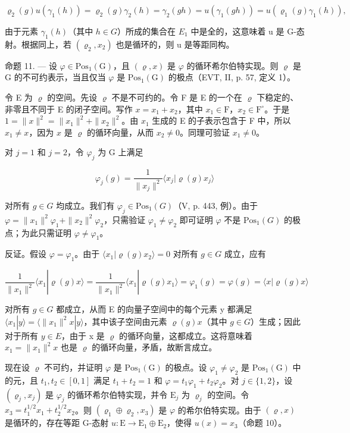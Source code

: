 \[
\varrho_ {2} (g) u \left(\gamma_ {1} (h)\right) = \varrho_ {2} (g) \gamma_ {2} (h) = \gamma_ {2} (g h) = u \left(\gamma_ {1} (g h)\right) = u \left(\varrho_ {1} (g) \gamma_ {1} (h)\right),
\]

由于元素 \(\gamma_{1}(h)\)（其中 \(h \in G\)）所成的集合在 \(E_{1}\) 中是全的，这意味着 u 是 G-态射。根据同上，若 \((\varrho_{2}, x_{2})\) 也是循环的，则 u 是等距同构。

命题 11. — 设 \(\varphi \in \mathrm{Pos}_{1}(\mathrm{G})\)，且 \((\varrho, x)\) 是 \(\varphi\) 的循环希尔伯特实现。则 \(\varrho\) 是 G 的不可约表示，当且仅当 \(\varphi\) 是 \(\mathrm{Pos}_{1}(\mathrm{G})\) 的极点（EVT, II, p. 57, 定义 1）。

令 E 为 \(\varrho\) 的空间。先设 \(\varrho\) 不是不可约的。令 F 是 E 的一个在 \(\varrho\) 下稳定的、非零且不同于 E 的闭子空间。写作 \(x = x_1 + x_2\)，其中 \(x_1 \in \mathrm{F}\)，\(x_2 \in \mathrm{F}^\circ\)。于是 \(1 = \|x\|^2 = \|x_1\|^2 + \|x_2\|^2\)。由 \(x_1\) 生成的 E 的子表示包含于 F 中，所以 \(x_1 \neq x\)，因为 \(x\) 是 \(\varrho\) 的循环向量，从而 \(x_2 \neq 0\)。同理可验证 \(x_1 \neq 0\)。

对 \(j = 1\) 和 \(j = 2\)，令 \(\varphi_j\) 为 G 上满足

\[
\varphi_ {j} (g) = \frac {1}{\| x _ {j} \| ^ {2}} \langle x _ {j} | \varrho (g) x _ {j} \rangle
\]

对所有 \(g \in G\) 均成立。我们有 \(\varphi_{j} \in \mathrm{Pos}_{1}(G)\)（V, p. 443, 例）。由于 \(\varphi = \|x_{1}\|^{2}\varphi_{1} + \|x_{2}\|^{2}\varphi_{2}\)，只需验证 \(\varphi_{1} \neq \varphi_{2}\) 即可证明 \(\varphi\) 不是 \(\mathrm{Pos}_{1}(G)\) 的极点；为此只需证明 \(\varphi \neq \varphi_{1}\)。

反证。假设 \(\varphi = \varphi_1\)。由于 \(\langle x_1 | \varrho(g)x_2 \rangle = 0\) 对所有 \(g \in G\) 成立，应有

\[
\frac {1}{\| x _ {1} \| ^ {2}} \langle x _ {1} | \varrho (g) x \rangle = \frac {1}{\| x _ {1} \| ^ {2}} \langle x _ {1} | \varrho (g) x _ {1} \rangle = \varphi_ {1} (g) = \varphi (g) = \langle x | \varrho (g) x \rangle
\]

对所有 \(g \in G\) 都成立，从而 E 的向量子空间中的每个元素 y 都满足 \(\langle x_{1} | y \rangle = \langle \|x_{1}\|^{2}x | y \rangle\)，其中该子空间由元素 \(\varrho(g)x\)（其中 \(g \in G\)）生成；因此对于所有 \(y \in E\)，由于 x 是 \(\varrho\) 的循环向量，这都成立。这将意味着 \(x_{1} = \|x_{1}\|^{2}x\) 也是 \(\varrho\) 的循环向量，矛盾，故断言成立。

现在设 \(\varrho\) 不可约，并证明 \(\varphi\) 是 \(\mathrm{Pos}_1(\mathrm{G})\) 的极点。设 \(\varphi_1 \neq \varphi_2\) 是 \(\mathrm{Pos}_1(\mathrm{G})\) 中的元，且 \(t_1, t_2 \in [0,1]\) 满足 \(t_1 + t_2 = 1\) 和 \(\varphi = t_1\varphi_1 + t_2\varphi_2\)。对 \(j \in \{1,2\}\)，设 \((\varrho_j, x_j)\) 是 \(\varphi_j\) 的循环希尔伯特实现，并令 \(\mathrm{E}_j\) 为 \(\varrho_j\) 的空间。令 \(x_3 = t_1^{1/2}x_1 + t_2^{1/2}x_2\)。则 \((\varrho_1 \oplus \varrho_2, x_3)\) 是 \(\varphi\) 的希尔伯特实现。由于 \((\varrho, x)\) 是循环的，存在等距 G-态射 \(u: \mathrm{E} \to \mathrm{E}_1 \oplus \mathrm{E}_2\)，使得 \(u(x) = x_3\)（命题 10）。

